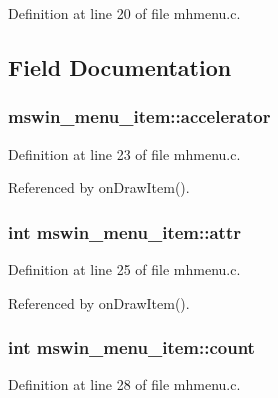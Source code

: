 Definition at line 20 of file mhmenu.\+c.



\subsection{Field Documentation}
\hypertarget{structmswin__menu__item_a68edbe01b9a5545b8d4c54fb70a51300}{
\subsubsection[{accelerator}]{ mswin\+\_\+menu\+\_\+item\+::accelerator}}\label{structmswin__menu__item_a68edbe01b9a5545b8d4c54fb70a51300}


Definition at line 23 of file mhmenu.\+c.



Referenced by on\+Draw\+Item().

\hypertarget{structmswin__menu__item_aac16c04c8ecd7b7870d65034453cfd34}{
\subsubsection[{attr}]{\setlength{\rightskip}{0pt plus 5cm}int mswin\+\_\+menu\+\_\+item\+::attr}}\label{structmswin__menu__item_aac16c04c8ecd7b7870d65034453cfd34}


Definition at line 25 of file mhmenu.\+c.



Referenced by on\+Draw\+Item().

\hypertarget{structmswin__menu__item_a28629e81df6ba5b0b67cf8309e20edaa}{
\subsubsection[{count}]{\setlength{\rightskip}{0pt plus 5cm}int mswin\+\_\+menu\+\_\+item\+::count}}\label{structmswin__menu__item_a28629e81df6ba5b0b67cf8309e20edaa}


Definition at line 28 of file mhmenu.\+c.




